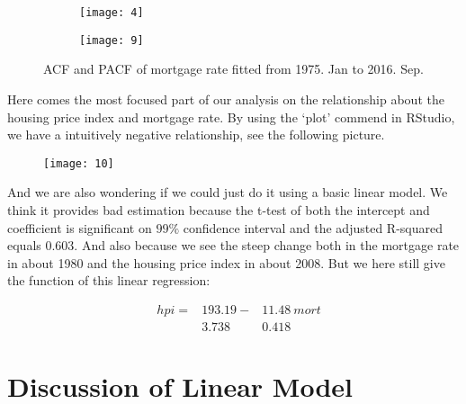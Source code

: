 \documentclass[12pt,letterpaper]{article}
\begin{document}
\begin{figure*}[h!]
\begin{subfigure}[b]{0.4\textwidth}
\begin{center}
 \texttt{[image: 4]}
 \vspace{-0.4cm}
\end{center}
\end{subfigure}
\qquad
\qquad
\begin{subfigure}[b]{0.4\textwidth}
\begin{center}
 \texttt{[image: 9]}
 \vspace{-0.4cm}
\end{center}
\end{subfigure}
 \vspace{-.1cm}
 \caption{ ACF and PACF of mortgage rate fitted from 1975. Jan to 2016. Sep.}
      \label{fig:time}
\vspace{-.25cm}
\end{figure*}

Here comes the most focused part of our analysis on the relationship about the housing price index and mortgage rate. 
By using the `plot' commend in RStudio, we have a intuitively negative relationship, see the following picture.

\begin{figure}[h!]
\centering
 \texttt{[image: 10]}\\
\end{figure}

And we are also wondering if we could just do it using a basic linear model. 
We think it provides bad estimation because the t-test of both the intercept and coefficient is significant on $99\%$ confidence interval and the adjusted R-squared equals 0.603. 
And also because we see the steep change both in the mortgage rate in about 1980 and the housing price index in about 2008.
But we here still give the function of this linear regression:

\begin{equation}
\begin{aligned}
&hpi =&193.19  -  &11.48 { \ }mort \\
&        & 3.738   \quad&0.418
\end{aligned}
\end{equation}

\section{Discussion of Linear Model}
\end{document}
